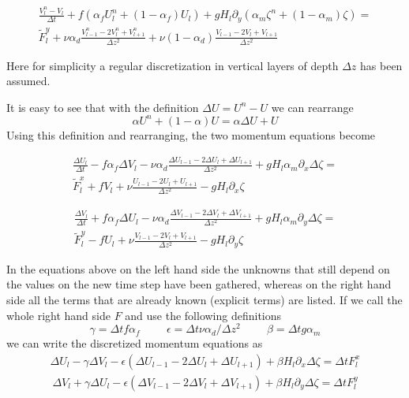 \documentclass[12pt,draft]{article}
\newcommand{\beq}{\begin{equation}}
\newcommand{\eeq}{\end{equation}}
\newcommand{\Unew}{U^n}
\newcommand{\Vnew}{V^n}
\newcommand{\znew}{\zeta^n}
\newcommand{\Uold}{U}
\newcommand{\Vold}{V}
\newcommand{\zold}{\zeta}
\newcommand{\Udel}{\Delta U}
\newcommand{\Vdel}{\Delta V}
\newcommand{\zdel}{\Delta \zeta}
\newcommand{\dt}{\Delta t}
\newcommand{\dz}{\Delta z}
\newcommand{\Ftx}[1]{\tilde{F}^x_{#1}}
\newcommand{\Fty}[1]{\tilde{F}^y_{#1}}
\newcommand{\delx}{\partial_x}
\newcommand{\dely}{\partial_y}
\begin{document}
\begin{multline}
	\frac{\Vnew_l-\Vold_l}{\dt} 
	+ f(\alpha_f\Unew_l + (1-\alpha_f)\Uold_l) 
	+ gH_l \dely(\alpha_m\znew + (1-\alpha_m)\zold)  
	= \\
	\Fty{l}
	+ \nu\alpha_d\frac{\Vnew_{l-1}-2\Vnew_l+\Vnew_{l+1}}{\dz^2}
	+ \nu(1-\alpha_d)\frac{\Vold_{l-1}-2\Vold_l+\Vold_{l+1}}{\dz^2}
\end{multline}

Here for simplicity a regular discretization in vertical layers
of depth $\dz$ has been assumed.

It is easy to see that with the definition
$\Udel = \Unew - \Uold$ we can rearrange
\beq
\alpha\Unew + (1-\alpha)\Uold = \alpha\Udel + \Uold
\eeq 
Using this definition and rearranging,
the two momentum equations become

\begin{multline}
	\frac{\Udel_l}{\dt} 
	- f\alpha_f\Vdel_l 
	- \nu\alpha_d\frac{\Udel_{l-1}-2\Udel_l+\Udel_{l+1}}{\dz^2}
	+ gH_l\alpha_m\delx\zdel 
	= \\
	\Ftx{l}
	+ f\Vold_l
	+ \nu\frac{\Uold_{l-1}-2\Uold_l+\Uold_{l+1}}{\dz^2}
	- gH_l\delx\zold 
\end{multline}

\begin{multline}
	\frac{\Vdel_l}{\dt} 
	+ f\alpha_f\Udel_l 
	- \nu\alpha_d\frac{\Vdel_{l-1}-2\Vdel_l+\Vdel_{l+1}}{\dz^2}
	+ gH_l\alpha_m\dely\zdel 
	= \\
	\Fty{l}
	- f\Uold_l
	+ \nu\frac{\Vold_{l-1}-2\Vold_l+\Vold_{l+1}}{\dz^2}
	- gH_l\dely\zold 
\end{multline}

In the equations above on the left hand side the unknowns 
that still depend on the values on the new time step
have been gathered,
whereas on the right hand side all the terms that are already known (explicit terms)
are listed. If we call the whole right hand side $F$ and use 
the following definitions
\begin{equation}
	\gamma=\dt f\alpha_f 
	\hspace{1cm}
	\epsilon=\dt\nu\alpha_d/\dz^2
	\hspace{1cm}
	\beta=\dt g\alpha_m
\end{equation}
we can write the discretized momentum equations as
\begin{multline}
	\Udel_l - \gamma\Vdel_l 
	- \epsilon(\Udel_{l-1}-2\Udel_l+\Udel_{l+1})
	+ \beta H_l\delx\zdel 
	= \dt F^x_l
\end{multline}
\begin{multline}
	\Vdel_l + \gamma\Udel_l 
	- \epsilon(\Vdel_{l-1}-2\Vdel_l+\Vdel_{l+1})
	+ \beta H_l\dely\zdel 
	= \dt F^y_l
\end{multline}
\end{document}
